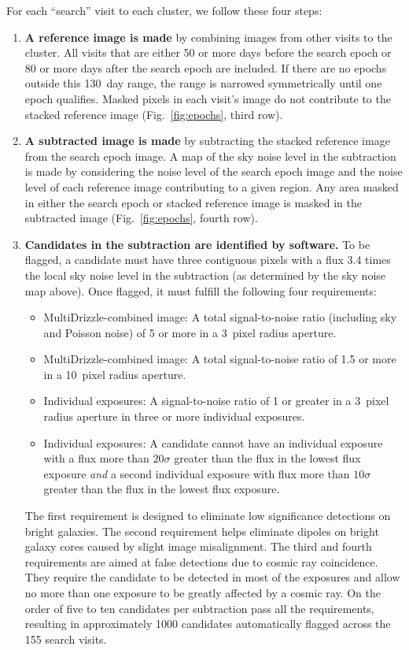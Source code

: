 For each ``search'' visit to each cluster, we follow these four steps:
\begin{enumerate}
\item {\bf A reference image is made} by combining images from
other visits to the cluster. All visits that are either 50 or more
days before the search epoch or 80 or more days after the search epoch
are included. If there are no epochs outside this 130~day range, the
range is narrowed symmetrically until one epoch qualifies. Masked
pixels in each visit's image do not contribute to the stacked
reference image (Fig.~\ref{fig:epochs}, third row).

\item {\bf A subtracted image is made} by subtracting the stacked
reference image from the search epoch image. A map of the sky noise
level in the subtraction is made by considering the noise level of the
search epoch image and the noise level of each reference image
contributing to a given region. Any area masked in either the search
epoch or stacked reference image is masked in the subtracted image
(Fig.~\ref{fig:epochs}, fourth row).

\item {\bf Candidates in the subtraction are identified by software.} To
  be flagged, a candidate must have three contiguous pixels with a flux
  3.4 times the local sky noise level in the subtraction (as
  determined by the sky noise map above). Once flagged, it must
  fulfill the following four requirements:
\begin{itemize}
\item {\sc MultiDrizzle}-combined image: A total signal-to-noise ratio 
  (including sky and Poisson noise) of 5 or more in a 3~pixel radius
  aperture.
\item {\sc MultiDrizzle}-combined image: A total signal-to-noise ratio 
  of 1.5 or more in a 10~pixel radius aperture.
\item Individual exposures: A signal-to-noise ratio of 1 or greater 
  in a 3~pixel radius aperture in three or more individual exposures.
\item Individual exposures: A candidate cannot have an individual exposure 
  with a flux more than $20\sigma$ greater than the flux in the lowest 
  flux exposure \emph{and} a second individual exposure with flux more 
  than $10\sigma$ greater than the flux in the lowest flux exposure.
\end{itemize}
The first requirement is designed to eliminate low significance
detections on bright galaxies. The second requirement helps eliminate
dipoles on bright galaxy cores caused by slight image misalignment. The
third and fourth requirements are aimed at false detections due to
cosmic ray coincidence. They require the candidate to be detected in
most of the exposures and allow no more than one exposure to be
greatly affected by a cosmic ray. On the order of five to ten
candidates per subtraction pass all the requirements, resulting in
approximately 1000 candidates automatically flagged across the 155
search visits.


\end{enumerate}
